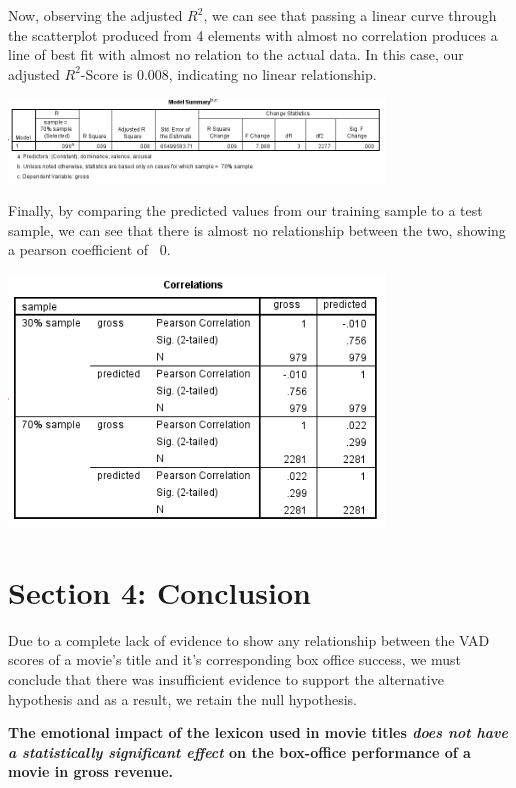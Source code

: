 \documentclass[font=10pt]{article}
\begin{document}
Now, observing the adjusted $R^{2}$, we can see that passing a linear curve through the scatterplot produced from 4 elements with almost no correlation produces a line of best fit with almost no relation to the actual data. In this case, our adjusted $R^{2}$-Score is 0.008, indicating no linear relationship. 

\begin{center}
	\includegraphics[width=10cm]{summary}
\end{center}

Finally, by comparing the predicted values from our training sample to a test sample, we can see that there is almost no relationship between the two, showing a pearson coefficient of ~0. 
\begin{center}
	\includegraphics[width=10cm]{crossvalidation}
\end{center}

\newpage
  \section{Section 4: Conclusion}
Due to a complete lack of evidence to show any relationship between the VAD scores of a movie's title and it's corresponding box office success, we must conclude that there was insufficient evidence to support the alternative hypothesis and as a result, we retain the null hypothesis. 

\textbf{The emotional impact of the lexicon used in movie titles \textit{does not have a statistically significant effect} on the box-office performance of a movie in gross revenue.}
\end{document}
